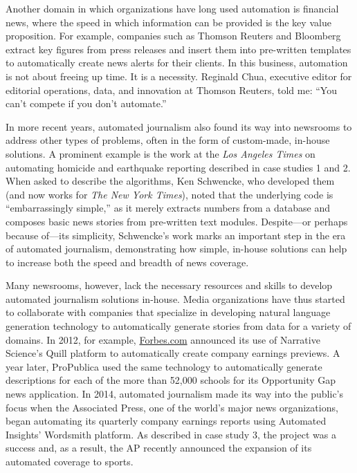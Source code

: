 \documentclass[notoc, symmetric, nobib, nols]{towcenter-guideto-book}
\begin{document}
Another domain in which organizations have long used automation is financial news, where the speed in which information can be provided is the key value proposition. For example, companies such as Thomson Reuters and Bloomberg extract key figures from press releases and insert them into pre-written templates to automatically create news alerts for their clients. In this business, automation is not about freeing up time. It is a necessity. Reginald Chua, executive editor for editorial operations, data, and innovation at Thomson Reuters, told me: ``You can't compete if you don't automate.''

In more recent years, automated journalism also found its way into newsrooms to address other types of problems, often in the form of custom-made, in-house solutions. A prominent example is the work at the \textit{Los Angeles Times} on automating homicide and earthquake reporting described in case studies 1 and 2. When asked to describe the algorithms, Ken Schwencke, who developed them (and now works for \textit{The New York Times}), noted that the underlying code is ``embarrassingly simple,'' as it merely extracts numbers from a database and composes basic news stories from pre-written text modules.\autocite{young15} Despite---or perhaps because of---its simplicity, Schwencke's work marks an important step in the era of automated journalism, demonstrating how simple, in-house solutions can help to increase both the speed and breadth of news coverage. 


Many newsrooms, however, lack the necessary resources and skills to develop automated journalism solutions in-house. Media organizations have thus started to collaborate with companies that specialize in developing natural language generation technology to automatically generate stories from data for a variety of domains. In 2012, for example, \href{http://Forbes.com}{Forbes.com} announced its use of Narrative Science's Quill platform to automatically create company earnings previews.\autocite{levy12} A year later, ProPublica used the same technology to automatically generate descriptions for each of the more than 52,000 schools for its Opportunity Gap news application.\autocite{klein13} In 2014, automated journalism made its way into the public's focus when the Associated Press, one of the world's major news organizations, began automating its quarterly company earnings reports using Automated Insights' Wordsmith platform. As described in case study 3, the project was a success and, as a result, the AP recently announced the expansion of its automated coverage to sports.\autocite{ap15} 
\end{document}

